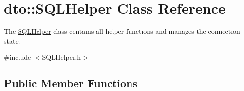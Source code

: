 \hypertarget{classdto_1_1_s_q_l_helper}{}\section{dto\+:\+:S\+Q\+L\+Helper Class Reference}
\label{classdto_1_1_s_q_l_helper}


The \mbox{\hyperlink{classdto_1_1_s_q_l_helper}{S\+Q\+L\+Helper}} class contains all helper functions and manages the connection state.  




{\ttfamily \#include $<$S\+Q\+L\+Helper.\+h$>$}

\subsection*{Public Member Functions}
